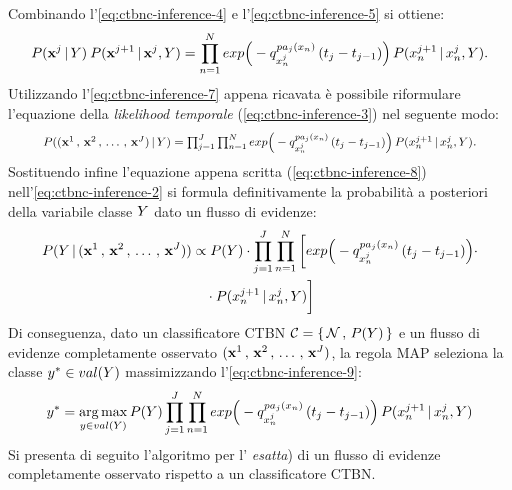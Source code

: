 Combinando l'\autoref{eq:ctbnc-inference-4} e l'\autoref{eq:ctbnc-inference-5} si ottiene:
\footnotesize
\begin{equation}\label{eq:ctbnc-inference-7}
P(\mathbf{x}^j\,\arrowvert\,\mathnormal{Y})\:P(\mathbf{x}^{j+1}\,\arrowvert\,\mathbf{x}^j,\mathnormal{Y})=\prod_{n=1}^N exp\Big(-q_{\mathnormal{x}_n^j}^{pa_j(\mathnormal{x}_n)}\,(t_j - t_{j-1})\Big)\,P(\mathnormal{x}_n^{j+1}\,\arrowvert\,\mathnormal{x}_n^j,\mathnormal{Y})\text{\normalsize .}
\end{equation}
\normalsize
Utilizzando l'\autoref{eq:ctbnc-inference-7} appena ricavata è possibile riformulare l'equazione della \emph{likelihood temporale} (\ref{eq:ctbnc-inference-3}) nel seguente modo:
\begin{equation}\label{eq:ctbnc-inference-8}
\resizebox{.89\hsize}{!}{$P(\evidencestream{J}\,\arrowvert\,\setel{Y})=\prod_{j=1}^{J}\prod_{n=1}^N exp\Big(-q_{\setel{x}_n^j}^{pa_j(\setel{x}_n)}\,(t_j - t_{j-1})\Big)\,P(\setel{x}_n^{j+1}\,\arrowvert\,\setel{x}_n^j,\setel{Y})$}\text{.}
\end{equation}
Sostituendo infine l'equazione appena scritta (\ref{eq:ctbnc-inference-8}) nell'\autoref{eq:ctbnc-inference-2} si formula definitivamente la probabilità a posteriori della variabile classe $\mathnormal{Y}$ dato un flusso di evidenze:
\begin{equation}\label{eq:ctbnc-inference-9}
\begin{split}
P(\mathnormal{Y}\,\arrowvert\,(\mathbf{x}^1\,,\,\mathbf{x}^2\,,\,\dotsc\,,\,\mathbf{x}^{J})) &\propto P(\mathnormal{Y}) \cdot \prod_{j=1}^{J}\prod_{n=1}^N\bigg[exp\Big(-q_{\mathnormal{x}_n^j}^{pa_j(\mathnormal{x}_n)}\,(t_j - t_{j-1})\Big) \cdot \\
& \quad \cdot P(\mathnormal{x}_n^{j+1}\,\arrowvert\,\mathnormal{x}_n^j,\mathnormal{Y})\bigg]
\end{split}
\end{equation}
Di conseguenza, dato un classificatore \acs{CTBN} $\mathcal{C}=\{\,\mathcal{N}\,,\,P(\mathnormal{Y})\,\}$ e un flusso di evidenze completamente osservato $(\mathbf{x}^1\,,\,\mathbf{x}^2\,,\,\dotsc\,,\,\mathbf{x}^{J})$, la regola \acs{MAP} seleziona la classe $\mathnormal{y}^* \in val(\mathnormal{Y})$ massimizzando l'\autoref{eq:ctbnc-inference-9}:
\begin{equation}\label{eq:ctbnc-inference-10}
\mathnormal{y}^*= \operatorname*{arg\,max}_{\mathnormal{y}\in val(\mathnormal{Y})}P(\mathnormal{Y})\prod_{j=1}^{J}\prod_{n=1}^N exp\Big(-q_{\mathnormal{x}_n^j}^{pa_j(\mathnormal{x}_n)}\,(t_j - t_{j-1})\Big)\,P(\mathnormal{x}_n^{j+1}\,\arrowvert\,\mathnormal{x}_n^j,\mathnormal{Y})
\end{equation}
Si presenta di seguito l'algoritmo per l'\emph{ esatta}) di un flusso di evidenze completamente osservato rispetto a un classificatore \acs{CTBN}.

